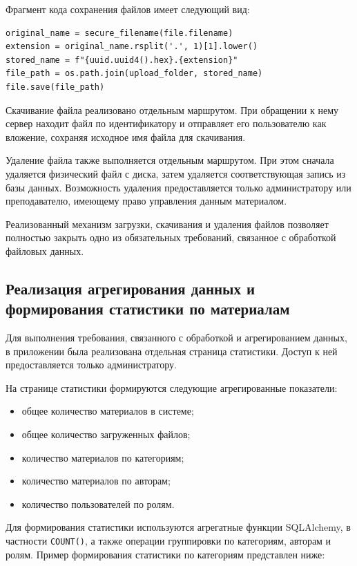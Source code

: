 Фрагмент кода сохранения файлов имеет следующий вид:

\begin{lstlisting}
original_name = secure_filename(file.filename)
extension = original_name.rsplit('.', 1)[1].lower()
stored_name = f"{uuid.uuid4().hex}.{extension}"
file_path = os.path.join(upload_folder, stored_name)
file.save(file_path)
\end{lstlisting}

Скачивание файла реализовано отдельным маршрутом. При обращении к нему сервер находит файл по идентификатору и отправляет его пользователю как вложение, сохраняя исходное имя файла для скачивания.

Удаление файла также выполняется отдельным маршрутом. При этом сначала удаляется физический файл с диска, затем удаляется соответствующая запись из базы данных. Возможность удаления предоставляется только администратору или преподавателю, имеющему право управления данным материалом.

Реализованный механизм загрузки, скачивания и удаления файлов позволяет полностью закрыть одно из обязательных требований, связанное с обработкой файловых данных.

\subsection{Реализация агрегирования данных и формирования статистики по материалам}

Для выполнения требования, связанного с обработкой и агрегированием данных, в приложении была реализована отдельная страница статистики. Доступ к ней предоставляется только администратору.

На странице статистики формируются следующие агрегированные показатели:

\begin{itemize}[leftmargin=1.25cm]
    \item общее количество материалов в системе;
    \item общее количество загруженных файлов;
    \item количество материалов по категориям;
    \item количество материалов по авторам;
    \item количество пользователей по ролям.
\end{itemize}

Для формирования статистики используются агрегатные функции SQLAlchemy, в частности \texttt{COUNT()}, а также операции группировки по категориям, авторам и ролям. Пример формирования статистики по категориям представлен ниже:

